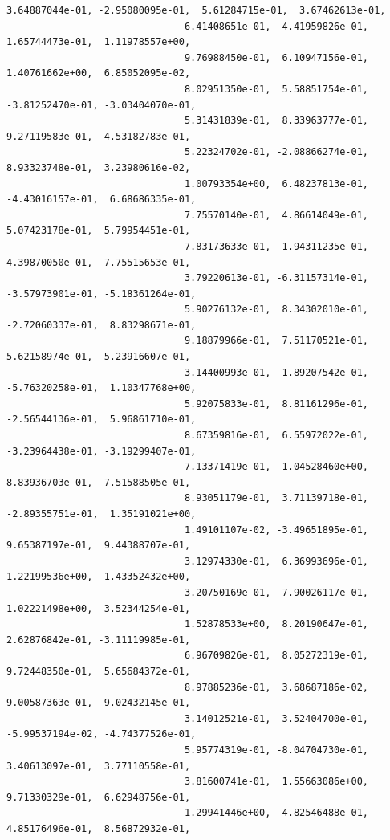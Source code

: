 \documentclass[11pt]{article}
\begin{document}
\begin{Verbatim}[commandchars=\\\{\}]
                               3.64887044e-01, -2.95080095e-01,  5.61284715e-01,  3.67462613e-01,
                               6.41408651e-01,  4.41959826e-01,  1.65744473e-01,  1.11978557e+00,
                               9.76988450e-01,  6.10947156e-01,  1.40761662e+00,  6.85052095e-02,
                               8.02951350e-01,  5.58851754e-01, -3.81252470e-01, -3.03404070e-01,
                               5.31431839e-01,  8.33963777e-01,  9.27119583e-01, -4.53182783e-01,
                               5.22324702e-01, -2.08866274e-01,  8.93323748e-01,  3.23980616e-02,
                               1.00793354e+00,  6.48237813e-01, -4.43016157e-01,  6.68686335e-01,
                               7.75570140e-01,  4.86614049e-01,  5.07423178e-01,  5.79954451e-01,
                              -7.83173633e-01,  1.94311235e-01,  4.39870050e-01,  7.75515653e-01,
                               3.79220613e-01, -6.31157314e-01, -3.57973901e-01, -5.18361264e-01,
                               5.90276132e-01,  8.34302010e-01, -2.72060337e-01,  8.83298671e-01,
                               9.18879966e-01,  7.51170521e-01,  5.62158974e-01,  5.23916607e-01,
                               3.14400993e-01, -1.89207542e-01, -5.76320258e-01,  1.10347768e+00,
                               5.92075833e-01,  8.81161296e-01, -2.56544136e-01,  5.96861710e-01,
                               8.67359816e-01,  6.55972022e-01, -3.23964438e-01, -3.19299407e-01,
                              -7.13371419e-01,  1.04528460e+00,  8.83936703e-01,  7.51588505e-01,
                               8.93051179e-01,  3.71139718e-01, -2.89355751e-01,  1.35191021e+00,
                               1.49101107e-02, -3.49651895e-01,  9.65387197e-01,  9.44388707e-01,
                               3.12974330e-01,  6.36993696e-01,  1.22199536e+00,  1.43352432e+00,
                              -3.20750169e-01,  7.90026117e-01,  1.02221498e+00,  3.52344254e-01,
                               1.52878533e+00,  8.20190647e-01,  2.62876842e-01, -3.11119985e-01,
                               6.96709826e-01,  8.05272319e-01,  9.72448350e-01,  5.65684372e-01,
                               8.97885236e-01,  3.68687186e-02,  9.00587363e-01,  9.02432145e-01,
                               3.14012521e-01,  3.52404700e-01, -5.99537194e-02, -4.74377526e-01,
                               5.95774319e-01, -8.04704730e-01,  3.40613097e-01,  3.77110558e-01,
                               3.81600741e-01,  1.55663086e+00,  9.71330329e-01,  6.62948756e-01,
                               1.29941446e+00,  4.82546488e-01,  4.85176496e-01,  8.56872932e-01,

\end{Verbatim}
\end{document}
